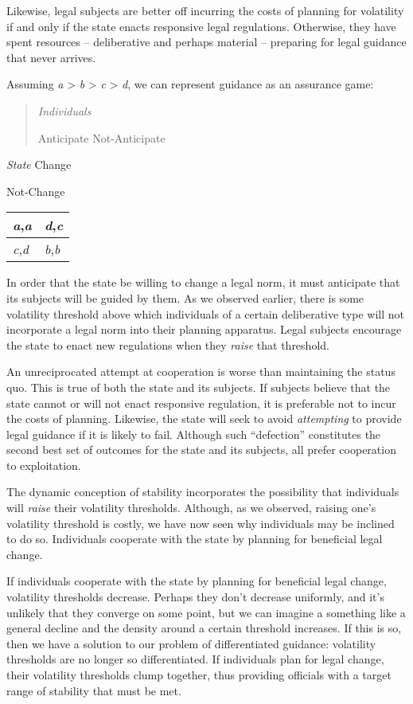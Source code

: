 Likewise, legal subjects are better off incurring the costs of planning
for volatility if and only if the state enacts responsive legal
regulations. Otherwise, they have spent resources -- deliberative and
perhaps material -- preparing for legal guidance that never arrives.

Assuming \emph{a} \textgreater{} \emph{b} \textgreater{} \emph{c}
\textgreater{} \emph{d}, we can represent guidance as an assurance game:

\begin{quote}
\emph{Individuals}

Anticipate Not-Anticipate
\end{quote}

\emph{State} Change

Not-Change

\begin{longtable}[c]{@{}ll@{}}
\toprule
\emph{a},\emph{a} & \emph{d},\emph{c}\tabularnewline
\midrule
\endhead
\emph{c},\emph{d} & \emph{b},\emph{b}\tabularnewline
\bottomrule
\end{longtable}

In order that the state be willing to change a legal norm, it must
anticipate that its subjects will be guided by them. As we observed
earlier, there is some volatility threshold above which individuals of a
certain deliberative type will not incorporate a legal norm into their
planning apparatus. Legal subjects encourage the state to enact new
regulations when they \emph{raise} that threshold.

An unreciprocated attempt at cooperation is worse than maintaining the
status quo. This is true of both the state and its subjects. If subjects
believe that the state cannot or will not enact responsive regulation,
it is preferable not to incur the costs of planning. Likewise, the state
will seek to avoid \emph{attempting} to provide legal guidance if it is
likely to fail. Although such ``defection'' constitutes the second best
set of outcomes for the state and its subjects, all prefer cooperation
to exploitation.

The dynamic conception of stability incorporates the possibility that
individuals will \emph{raise} their volatility thresholds. Although, as
we observed, raising one's volatility threshold is costly, we have now
seen why individuals may be inclined to do so. Individuals cooperate
with the state by planning for beneficial legal change.

If individuals cooperate with the state by planning for beneficial legal
change, volatility thresholds decrease. Perhaps they don't decrease
uniformly, and it's unlikely that they converge on some point, but we
can imagine a something like a general decline and the density around a
certain threshold increases. If this is so, then we have a solution to
our problem of differentiated guidance: volatility thresholds are no
longer so differentiated. If individuals plan for legal change, their
volatility thresholds clump together, thus providing officials with a
target range of stability that must be met.

